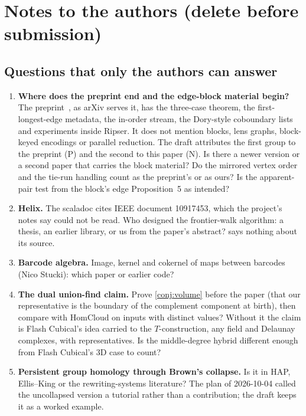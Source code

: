 \ifdraft
\section{Notes to the authors (delete before submission)}\label{app:notes}

\subsection{Questions that only the authors can answer}

\begin{enumerate}[leftmargin=2em, itemsep=3pt]
\item \textbf{Where does the preprint end and the edge-block material begin?} The preprint~\cite{bauer2024generating}, as arXiv
  serves it, has the three-case theorem, the first-longest-edge metadata, the in-order stream, the Dory-style coboundary lists and
  experiments inside Ripser. It does not mention blocks, lens graphs, block-keyed encodings or parallel reduction. The draft
  attributes the first group to the preprint (P) and the second to this paper (N). Is there a newer version or a second paper that carries the block
  material? Do the mirrored vertex order and the tie-run handling count as the preprint's or as ours? Is the apparent-pair test from the block's edge
  Proposition~5 as intended?
\item \textbf{Helix.} The scaladoc cites IEEE document 10917453, which the project's notes say could not be read. Who designed the
  frontier-walk algorithm: a thesis, an earlier library, or us from the paper's abstract?  says nothing about its source.
\item \textbf{Barcode algebra.} Image, kernel and cokernel of maps between barcodes (Nico Stucki): which paper or earlier code?
\item \textbf{The dual union-find claim.} Prove \cref{conj:volume} before the paper (that our representative is the boundary of the
  complement component at birth), then compare with HomCloud on inputs with distinct values? Without it the claim is Flash Cubical's idea carried to
  the $T$-construction, any field and Delaunay complexes, with representatives. Is the middle-degree hybrid different enough from Flash Cubical's 3D case to count?
\item \textbf{Persistent group homology through Brown's collapse.} Is it in HAP, Ellis--King or the rewriting-systems literature? The plan of
  2026-10-04 called the uncollapsed version a tutorial rather than a contribution; the draft keeps it as a worked example.

\end{enumerate}
